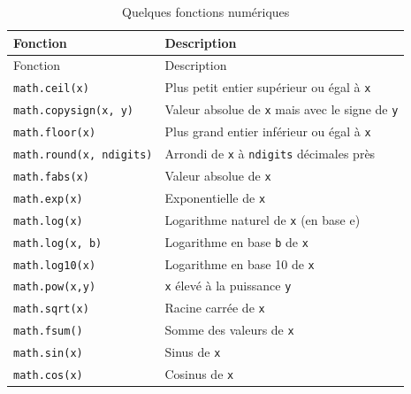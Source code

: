\documentclass[
  12pt,
]{book}
\numberwithin{equation}{section}
\numberwithin{countremarque}{section}
\begin{document}
\begin{longtable}[]{@{}
  >{\raggedleft\arraybackslash}p{}
  >{\raggedleft\arraybackslash}p{}@{}}
\caption{\label{tab:fonctions-numeriques} Quelques fonctions numériques}\tabularnewline
\toprule\noalign{}
\begin{minipage}[b]{\linewidth}\raggedleft
Fonction
\end{minipage} & \begin{minipage}[b]{\linewidth}\raggedleft
Description
\end{minipage} \\
\midrule\noalign{}
\endfirsthead
\toprule\noalign{}
\begin{minipage}[b]{\linewidth}\raggedleft
Fonction
\end{minipage} & \begin{minipage}[b]{\linewidth}\raggedleft
Description
\end{minipage} \\
\midrule\noalign{}
\endhead
\bottomrule\noalign{}
\endlastfoot
\texttt{math.ceil(x)} & Plus petit entier supérieur ou égal à \texttt{x} \\
\texttt{math.copysign(x,\ y)} & Valeur absolue de \texttt{x} mais avec le signe de \texttt{y} \\
\texttt{math.floor(x)} & Plus grand entier inférieur ou égal à \texttt{x} \\
\texttt{math.round(x,\ ndigits)} & Arrondi de \texttt{x} à \texttt{ndigits} décimales près \\
\texttt{math.fabs(x)} & Valeur absolue de \texttt{x} \\
\texttt{math.exp(x)} & Exponentielle de \texttt{x} \\
\texttt{math.log(x)} & Logarithme naturel de \texttt{x} (en base e) \\
\texttt{math.log(x,\ b)} & Logarithme en base \texttt{b} de \texttt{x} \\
\texttt{math.log10(x)} & Logarithme en base 10 de \texttt{x} \\
\texttt{math.pow(x,y)} & \texttt{x} élevé à la puissance \texttt{y} \\
\texttt{math.sqrt(x)} & Racine carrée de \texttt{x} \\
\texttt{math.fsum()} & Somme des valeurs de \texttt{x} \\
\texttt{math.sin(x)} & Sinus de \texttt{x} \\
\texttt{math.cos(x)} & Cosinus de \texttt{x} \\

\end{longtable}
\end{document}
